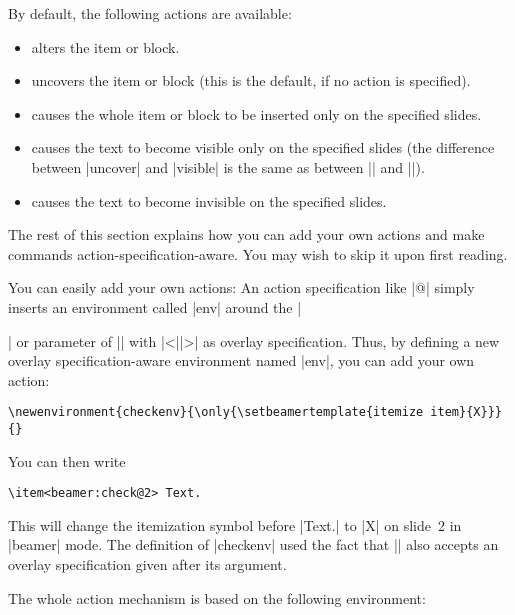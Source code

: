 By default, the following actions are available:
\begin{itemize}
\item {} alters the item or block.
\item {} uncovers the item or block (this is the default, if no action is specified).
\item {} causes the whole item or block to be inserted only on the specified slides.
\item {} causes the text to become visible only on the specified slides (the difference between |uncover| and |visible| is the same as between |\uncover| and |\visible|).
\item {} causes the text to become invisible on the specified slides.
\end{itemize}

The rest of this section explains how you can add your own actions and make commands action-specification-aware. You may wish to skip it upon first reading.

You can easily add your own actions: An action specification like |@| simply inserts an environment called |env| around the |\item| or parameter of |\action| with |<||>| as overlay specification. Thus, by defining a new overlay specification-aware environment named |env|, you can add your own action:
\begin{verbatim}
\newenvironment{checkenv}{\only{\setbeamertemplate{itemize item}{X}}}{}
\end{verbatim}

You can then write
\begin{verbatim}
\item<beamer:check@2> Text.
\end{verbatim}

This will change the itemization symbol before |Text.| to |X| on slide~2 in |beamer| mode. The definition of |checkenv| used the fact that |\only| also accepts an overlay specification given after its argument.

The whole action mechanism is based on the following environment:

